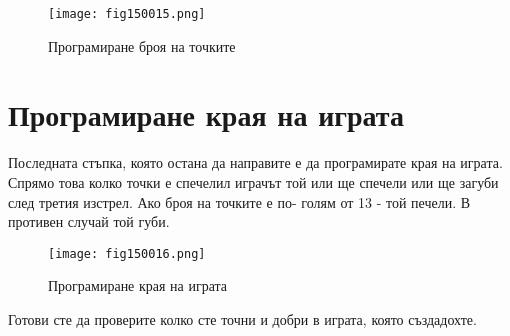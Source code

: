 \begin{figure}[H]
  \centering
  \texttt{[image: fig150015.png]}
  \caption{Програмиране броя на точките}
\label{fig150015}
\end{figure}

\section{Програмиране края на играта}

Последната стъпка, която остана да направите е да програмирате края на играта. Спрямо това колко точки е спечелил играчът той или ще спечели или ще загуби след третия изстрел. Ако броя на точките е по- голям от 13 - той печели. В противен случай той губи.

\begin{figure}[H]
  \centering
  \texttt{[image: fig150016.png]}
  \caption{Програмиране края на играта}
\label{fig150016}
\end{figure}

Готови сте да проверите колко сте точни и добри в играта, която създадохте.